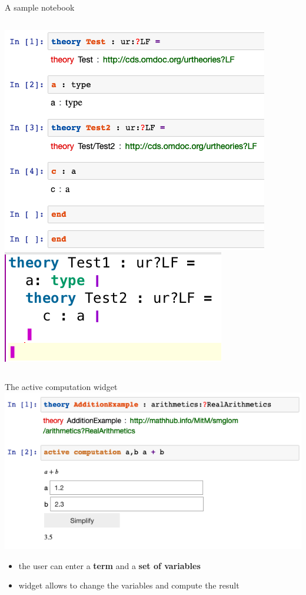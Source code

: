 \documentclass{beamer}
\begin{document}
    \begin{frame}{A sample notebook}
         \begin{columns}
            \centering
            \includegraphics[scale=0.4]{images/notebooknested}
            \centering
            \includegraphics[scale=0.8]{images/theorynested}
        \end{columns}
    \end{frame}

    \begin{frame}{The active computation widget}
        \includegraphics[scale=.5]{images/activecomp}
        \begin{itemize}
            \item the user can enter a \textbf{term} and a \textbf{set of variables}
            \item widget allows to change the variables and compute the result
        \end{itemize}
    \end{frame}
\end{document}
